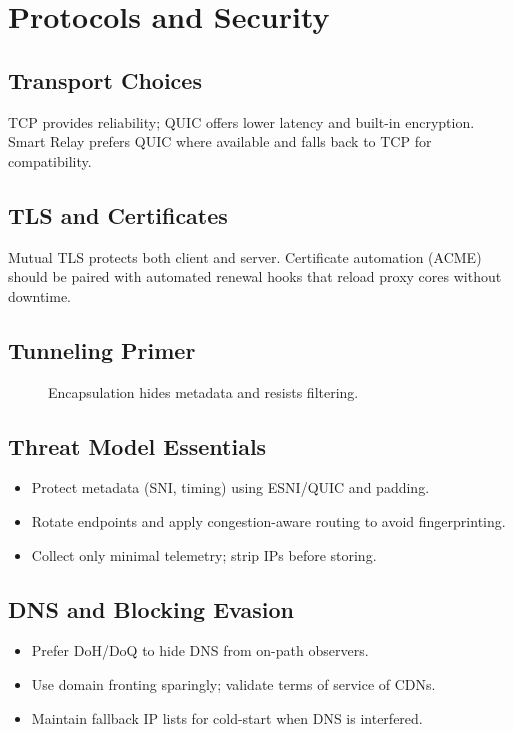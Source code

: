 \chapter{Protocols and Security}

\section{Transport Choices}
TCP provides reliability; QUIC offers lower latency and built-in encryption. Smart Relay prefers QUIC where available and falls back to TCP for compatibility.

\section{TLS and Certificates}
Mutual TLS protects both client and server. Certificate automation (ACME) should be paired with automated renewal hooks that reload proxy cores without downtime.

\section{Tunneling Primer}
\begin{figure}[h]
    \centering
    \caption{Encapsulation hides metadata and resists filtering.}
\end{figure}

\section{Threat Model Essentials}
\begin{itemize}
    \item Protect metadata (SNI, timing) using ESNI/QUIC and padding.
    \item Rotate endpoints and apply congestion-aware routing to avoid fingerprinting.
    \item Collect only minimal telemetry; strip IPs before storing.
\end{itemize}

\section{DNS and Blocking Evasion}
\begin{itemize}
    \item Prefer DoH/DoQ to hide DNS from on-path observers.
    \item Use domain fronting sparingly; validate terms of service of CDNs.
    \item Maintain fallback IP lists for cold-start when DNS is interfered.
\end{itemize}

